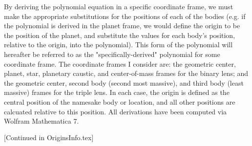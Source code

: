 \documentclass{article}
\begin{document}
By deriving the polynomial equation in a specific coordinate frame, we
must make the appropriate substitutions for the positions of each
of the bodies (e.g. if the polynomial is derived in the planet frame, we
would define the origin to be the position of the planet, and substitute the
values for each body's position, relative to the origin, into the polynomial).
This form of the polynomial will hereafter be referred to as the
"specifically-derived" polynomial for some coordinate frame. The coordinate
frames I consider are: the geometric center, planet, star, planetary caustic,
and center-of-mass frames for the binary lens; and the geometric center,
second body (second most massive), and third body (least massive) frames for
the triple lens. In each case, the origin is defined as the central position
of the namesake body or location, and all other positions are calcuated relative
to this position. All derivations have been computed via Wolfram Mathematica 7.

[Continued in OriginsInfo.tex]
\end{document}
